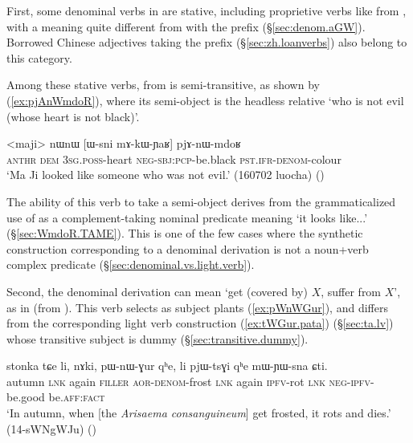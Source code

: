 First, some denominal verbs in  are stative, including proprietive verbs like   from , with a meaning quite different from  with the  prefix (§\ref{sec:denom.aGW}).  Borrowed Chinese adjectives taking the  prefix (§\ref{sec:zh.loanverbs}) also belong to this category.
 
Among these stative verbs,   from   is semi-transitive, as shown by (\ref{ex:pjAnWmdoR}), where its semi-object is the headless relative  `who is not evil (whose heart is not black)'.  
  
\begin{exe}
\ex \label{ex:pjAnWmdoR}
 \gll <maji> nɯnɯ [ɯ-sni mɤ-kɯ-ɲaʁ] pjɤ-nɯ-mdoʁ  \\
  \textsc{anthr} \textsc{dem} \textsc{3sg}.\textsc{poss}-heart \textsc{neg}-\textsc{sbj}:\textsc{pcp}-be.black \textsc{pst}.\textsc{ifr}-\textsc{denom}-colour \\
 \glt `Ma Ji looked like someone who was not evil.' (160702 luocha) ()
\end{exe}

The ability of this verb to take a semi-object derives from the grammaticalized use of  as a complement-taking nominal predicate meaning `it looks like...' (§\ref{sec:WmdoR.TAME}). This is one of the few cases where the synthetic construction corresponding to a denominal derivation is not a noun+verb complex predicate (§\ref{sec:denominal.vs.light.verb}).

 
 
Second, the  denominal derivation can mean `get (covered by) $X$, suffer from $X$', as in  (from ). This verb selects as subject plants (\ref{ex:pWnWGur}), and differs from the corresponding light verb construction  (\ref{ex:tWGur.pata}) (§\ref{sec:ta.lv}) whose transitive subject is dummy (§\ref{sec:transitive.dummy}).
 
 
 \begin{exe}
\ex \label{ex:pWnWGur}
 \gll stonka tɕe li, nɤki, pɯ-nɯ-ɣur qʰe, li pjɯ-tsɣi qʰe mɯ-ɲɯ-sna ɕti. \\
autumn \textsc{lnk} again \textsc{filler} \textsc{aor}-\textsc{denom}-frost \textsc{lnk} again \textsc{ipfv}-rot \textsc{lnk} \textsc{neg}-\textsc{ipfv}-be.good be.\textsc{aff}:\textsc{fact} \\
\glt `In autumn, when [the \textit{Arisaema consanguineum}] get frosted, it rots and dies.' (14-sWNgWJu)
()
\end{exe}

